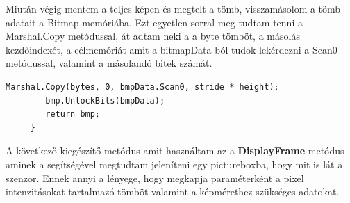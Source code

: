 \documentclass[]{thesis-ekf}
\theoremstyle{definition}
\theoremstyle{remark}
\begin{document}
Miután végig mentem a teljes képen és megtelt a tömb, visszamásolom a tömb adatait a Bitmap memóriába. Ezt egyetlen sorral meg tudtam tenni a Marshal.Copy\cite{marshal.copy} metódussal, át adtam neki a a byte tömböt, a másolás kezdőindexét, a célmemóriát amit a bitmapData-ból tudok lekérdezni a Scan0 metódussal, valamint a másolandó bitek számát.
\begin{lstlisting}[language=CSharp]	
	 	Marshal.Copy(bytes, 0, bmpData.Scan0, stride * height);
	 	bmp.UnlockBits(bmpData);
	 	return bmp;
	 }
\end{lstlisting}
A következő kiegészítő metódus amit használtam az a \textbf{DisplayFrame} metódus aminek a segítségével megtudtam jeleníteni egy pictureboxba, hogy mit is lát a szenzor. Ennek annyi a lényege, hogy megkapja paraméterként a pixel intenzitásokat tartalmazó tömböt valamint a képmérethez szükséges adatokat. 
\end{document}

